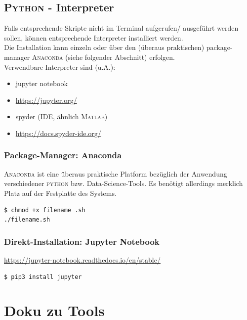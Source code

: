 \documentclass[
a4paper,     %
12pt         %
]{scrartcl}  %
\begin{document}
\subsection{\textsc{Python} - Interpreter}
Falls entsprechende Skripte nicht im Terminal aufgerufen/ ausgeführt werden sollen, können entsprechende Interpreter installiert werden.\\
Die Installation kann einzeln oder über den (überaus praktischen) package-manager \textsc{Anaconda} (siehe folgender Abschnitt) erfolgen.\\
Verwendbare Interpreter sind (u.A.):
\begin{itemize}
	\item jupyter notebook
	\item[] \url{https://jupyter.org/}
	\item spyder (IDE, ähnlich \textsc{Matlab})
	\item[] \url{https://docs.spyder-ide.org/}

\end{itemize}


\subsubsection{Package-Manager: Anaconda}
\label{conda-pack}
\textsc{Anaconda} ist eine überaus praktische Platform bezüglich der Anwendung verschiedener \textsc{python} bzw. Data-Science-Tools. Es benötigt allerdings merklich Platz auf der Festplatte des Systems.
\begin{lstlisting}
$ chmod +x filename .sh
./filename.sh
\end{lstlisting}

\subsubsection{Direkt-Installation: Jupyter Notebook}
\url{https://jupyter-notebook.readthedocs.io/en/stable/}
\begin{lstlisting}
$ pip3 install jupyter
\end{lstlisting}

\section{Doku zu Tools}
\end{document}
